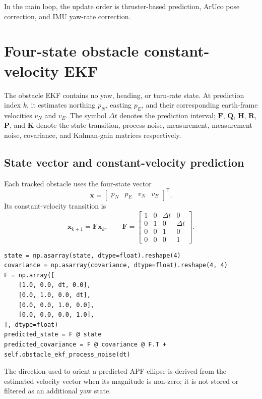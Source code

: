 \documentclass[11pt,a4paper]{article}
\begin{document}
In the main loop, the update order is thruster-based prediction, ArUco pose correction, and IMU yaw-rate correction.

\section{Four-state obstacle constant-velocity EKF}

The obstacle EKF contains no yaw, heading, or turn-rate state. At prediction
index $k$, it estimates northing $p_N$, easting $p_E$, and their corresponding
earth-frame velocities $v_N$ and $v_E$. The symbol $\Delta t$ denotes the
prediction interval; $\bm{F}$, $\bm{Q}$, $\bm{H}$, $\bm{R}$, $\bm{P}$, and
$\bm{K}$ denote the state-transition, process-noise, measurement, measurement-
noise, covariance, and Kalman-gain matrices respectively.

\subsection{State vector and constant-velocity prediction}

Each tracked obstacle uses the four-state vector
\begin{equation}
\bm{x}=
\begin{bmatrix}p_N&p_E&v_N&v_E\end{bmatrix}^{\mathsf T}.
\end{equation}
Its constant-velocity transition is
\begin{equation}
\bm{x}_{k+1}=\bm{F}\bm{x}_k,\qquad
\bm{F}=\begin{bmatrix}
1&0&\Delta t&0\\
0&1&0&\Delta t\\
0&0&1&0\\
0&0&0&1
\end{bmatrix}.
\end{equation}

\begin{lstlisting}
state = np.asarray(state, dtype=float).reshape(4)
covariance = np.asarray(covariance, dtype=float).reshape(4, 4)
F = np.array([
    [1.0, 0.0, dt, 0.0],
    [0.0, 1.0, 0.0, dt],
    [0.0, 0.0, 1.0, 0.0],
    [0.0, 0.0, 0.0, 1.0],
], dtype=float)
predicted_state = F @ state
predicted_covariance = F @ covariance @ F.T + self.obstacle_ekf_process_noise(dt)
\end{lstlisting}

The direction used to orient a predicted APF ellipse is derived from the
estimated velocity vector when its magnitude is non-zero; it is not stored or
filtered as an additional yaw state.
\end{document}

